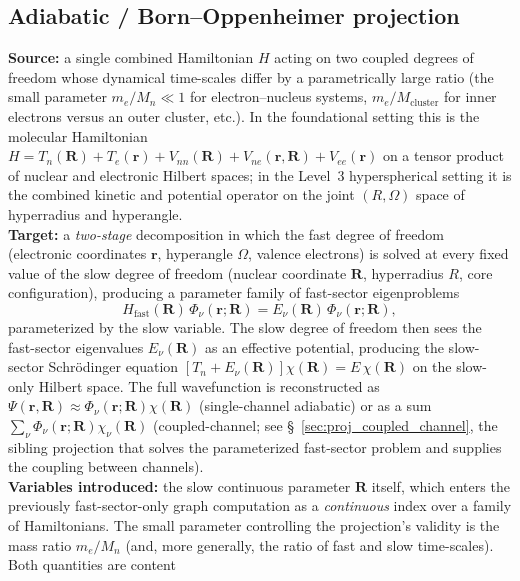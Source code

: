 \subsection{Adiabatic / Born--Oppenheimer projection}
\label{sec:proj_adiabatic_BO}
\textbf{Source:} a single combined Hamiltonian $H$ acting on two
coupled degrees of freedom whose dynamical time-scales differ by a
parametrically large ratio (the small parameter $m_e / M_n \ll 1$ for
electron--nucleus systems, $m_e / M_\text{cluster}$ for inner electrons
versus an outer cluster, etc.).  In the foundational setting this is
the molecular Hamiltonian $H = T_n(\bm{R}) + T_e(\bm{r}) +
V_{nn}(\bm{R}) + V_{ne}(\bm{r}, \bm{R}) + V_{ee}(\bm{r})$ on a tensor
product of nuclear and electronic Hilbert spaces; in the Level~3
hyperspherical setting it is the combined kinetic and potential
operator on the joint $(R, \Omega)$ space of hyperradius and
hyperangle.\\
\textbf{Target:} a \emph{two-stage} decomposition in which the fast
degree of freedom (electronic coordinates $\bm{r}$, hyperangle
$\Omega$, valence electrons) is solved at every fixed value of the
slow degree of freedom (nuclear coordinate $\bm{R}$, hyperradius $R$,
core configuration), producing a parameter family of fast-sector
eigenproblems
\begin{equation*}
  H_\text{fast}(\bm{R}) \, \Phi_\nu(\bm{r}; \bm{R})
  = E_\nu(\bm{R}) \, \Phi_\nu(\bm{r}; \bm{R}),
\end{equation*}
parameterized by the slow variable.  The slow degree of freedom then
sees the fast-sector eigenvalues $E_\nu(\bm{R})$ as an effective
potential, producing the slow-sector Schr\"odinger equation
$[T_n + E_\nu(\bm{R})] \chi(\bm{R}) = E\, \chi(\bm{R})$ on the
slow-only Hilbert space.  The full wavefunction is reconstructed as
$\Psi(\bm{r}, \bm{R}) \approx \Phi_\nu(\bm{r}; \bm{R}) \chi(\bm{R})$
(single-channel adiabatic) or as a sum
$\sum_\nu \Phi_\nu(\bm{r}; \bm{R}) \chi_\nu(\bm{R})$
(coupled-channel; see \S~\ref{sec:proj_coupled_channel}, the
sibling projection that solves the parameterized fast-sector problem
and supplies the coupling between channels).
\\
\textbf{Variables introduced:} the slow continuous parameter $\bm{R}$
itself, which enters the previously fast-sector-only graph
computation as a \emph{continuous} index over a family of
Hamiltonians.  The small parameter controlling the projection's
validity is the mass ratio $m_e / M_n$ (and, more generally, the
ratio of fast and slow time-scales).  Both quantities are content
